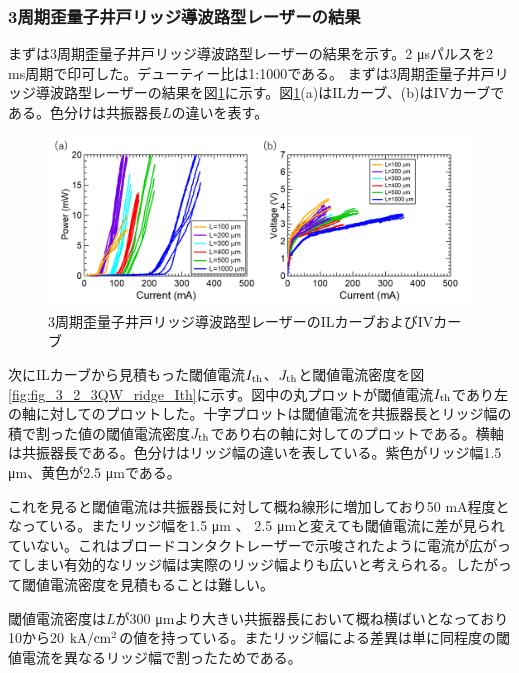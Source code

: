 {\subsubsection{3周期歪量子井戸リッジ導波路型レーザーの結果}
まずは3周期歪量子井戸リッジ導波路型レーザーの結果を示す。2 \si{\micro s}パルスを2 ms周期で印可した。デューティー比は1:1000である。
まずは3周期歪量子井戸リッジ導波路型レーザーの結果を図\ref{fig:fig_3_2_3QW_ridge_IL}に示す。図\ref{fig:fig_3_2_3QW_ridge_IL}(a)はILカーブ、(b)はIVカーブである。色分けは共振器長$L$の違いを表す。

\begin{figure}[h]
	\centering
	\includegraphics[width=15cm]{figure/fig_3_2_3QW_ridge_IL.png}
		\caption{3周期歪量子井戸リッジ導波路型レーザーのILカーブおよびIVカーブ}
		\label{fig:fig_3_2_3QW_ridge_IL}
\end{figure}


次にILカーブから見積もった閾値電流$I_{\rm{th}}$、$J_{\rm{th}}$と閾値電流密度を図\ref{fig:fig_3_2_3QW_ridge_Ith}に示す。図中の丸プロットが閾値電流$I_{\rm{th}}$であり左の軸に対してのプロットした。十字プロットは閾値電流を共振器長とリッジ幅の積で割った値の閾値電流密度$J_{\rm{th}}$であり右の軸に対してのプロットである。横軸は共振器長である。色分けはリッジ幅の違いを表している。紫色がリッジ幅1.5 \si{\micro\metre}、黄色が2.5 \si{\micro\metre}である。

これを見ると閾値電流は共振器長に対して概ね線形に増加しており50 mA程度となっている。またリッジ幅を1.5 \si{\micro\metre} 、 2.5 \si{\micro\metre}と変えても閾値電流に差が見られていない。これはブロードコンタクトレーザーで示唆されたように電流が広がってしまい有効的なリッジ幅は実際のリッジ幅よりも広いと考えられる。したがって閾値電流密度を見積もることは難しい。

閾値電流密度は$L$が300 \si{\micro\metre}より大きい共振器長において概ね横ばいとなっており10から20 $\rm{kA/cm^2}$の値を持っている。またリッジ幅による差異は単に同程度の閾値電流を異なるリッジ幅で割ったためである。


}
